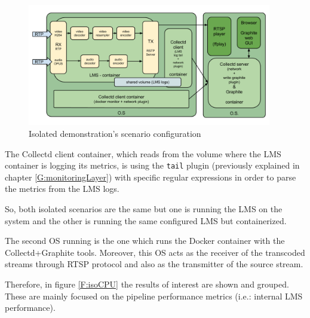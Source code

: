\begin{figure}[!htb]
\begin{center}
\includegraphics[width=0.95\textwidth]{./images/isolatedScenario.png}
\caption{Isolated demonstration's scenario configuration}
\label{F:idsc}
\end{center}
\end{figure}

The Collectd client container, which reads from the volume where the LMS container is logging its metrics, is using the \texttt{tail} plugin (previously explained in chapter \ref{G:monitoringLayer}) with specific regular expressions in order to parse the metrics from the LMS logs.

So, both isolated scenarios are the same but one is running the LMS on the system and the other is running the same configured LMS but containerized.

The second OS running is the one which runs the Docker container with the Collectd+Graphite tools. Moreover, this OS acts as the receiver of the transcoded streams through RTSP protocol and also as the transmitter of the source stream.

Therefore, in figure \ref{F:isoCPU} the results of interest are shown and grouped. These are mainly focused on the pipeline performance metrics (i.e.: internal LMS performance).

